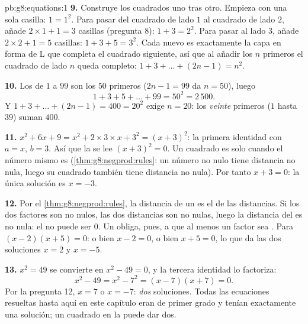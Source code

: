 \begin{solution}{pb:g8:equations:1}
\textbf{9.} Construye los cuadrados uno tras otro. Empieza con una
sola casilla: $1 = 1^2$. Para pasar del cuadrado de lado $1$ al
cuadrado de lado $2$, añade $2 \times 1 + 1 = 3$ casillas (pregunta
8): $1 + 3 = 2^2$. Para pasar al lado $3$, añade $2 \times 2 + 1 = 5$
casillas: $1 + 3 + 5 = 3^2$. Cada nuevo  es exactamente la
capa en forma de L que completa el cuadrado siguiente, así que al añadir los
$n$ primeros  el cuadrado de lado $n$ queda completo:
$1 + 3 + \dots + (2n - 1) = n^2$.

\textbf{10.} Los  de $1$ a $99$ son los $50$ primeros
($2n - 1 = 99$ da $n = 50$), luego
\[
1 + 3 + 5 + \dots + 99 = 50^2 = 2\,500 .
\]
Y $1 + 3 + \dots + (2n - 1) = 400 = 20^2$ exige $n = 20$:
los \emph{veinte} primeros  ($1$ hasta $39$) suman
$400$.

\textbf{11.} $x^2 + 6x + 9 = x^2 + 2 \times 3 \times x + 3^2 =
(x + 3)^2$: la primera identidad con $a = x$, $b = 3$. Así que la
 se lee $(x + 3)^2 = 0$. Un cuadrado es  solo cuando el
número mismo es  (\cref{thm:g8:negprod:rules}: un número no
nulo tiene distancia no nula, luego su cuadrado también tiene distancia
no nula). Por tanto $x + 3 = 0$: la única solución es $x = -3$.

\textbf{12.} Por el \cref{thm:g8:negprod:rules}, la distancia de un
 es el  de las distancias. Si los dos factores son
no nulos, las dos distancias son no nulas, luego la distancia del  es
no nula: el  no puede ser $0$. Un   obliga, pues,
a que al menos un factor sea . Para $(x - 2)(x + 5) = 0$: o bien
$x - 2 = 0$, o bien $x + 5 = 0$, lo que da las dos soluciones $x = 2$ y
$x = -5$.

\textbf{13.} $x^2 = 49$ se convierte en $x^2 - 49 = 0$, y la tercera
identidad lo factoriza:
\[
x^2 - 49 = x^2 - 7^2 = (x - 7)(x + 7) = 0 .
\]
Por la pregunta 12, $x = 7$ o $x = -7$: \emph{dos} soluciones. Todas las
ecuaciones resueltas hasta aquí en este capítulo eran de primer grado y
tenían exactamente una solución; un cuadrado en la  puede dar
dos.


\end{solution}
